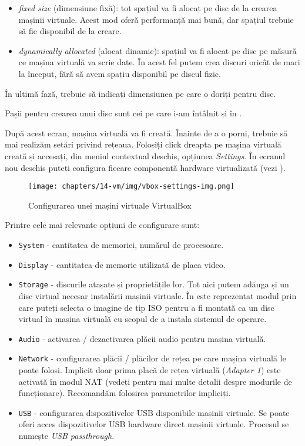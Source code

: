 \begin{itemize}
  \item \textit{fixed size} (dimensiune fixă): tot spațiul va fi alocat pe disc de la crearea mașinii virtuale.
    Acest mod oferă performanță mai bună, dar spațiul trebuie să fie disponibil de la creare.
  \item \textit{dynamically allocated} (alocat dinamic): spațiul va fi alocat pe disc pe măsură ce mașina virtuală va scrie date.
    În acest fel putem crea discuri oricât de mari la început, fără să avem spațiu disponibil pe discul fizic.
\end{itemize}

În ultimă fază, trebuie să indicați dimensiunea pe care o doriți pentru disc.

Pașii pentru crearea unui disc sunt cei pe care i-am întâlnit și în .

După acest ecran, mașina virtuală va fi creată.
Înainte de a o porni, trebuie să mai realizăm setări privind rețeaua.
Folosiți click dreapta pe mașina virtuală creată și accesați, din meniul contextual deschis, opțiunea \textit{Settings}.
În ecranul nou deschis puteți configura fiecare componentă hardware virtualizată (vezi ).

\begin{figure}[!htbp]
  \centering
  \texttt{[image: chapters/14-vm/img/vbox-settings-img.png]}
  \caption{Configurarea unei mașini virtuale VirtualBox}
  \label{fig:vm:vbox-settings}
\end{figure}

Printre cele mai relevante opțiuni de configurare sunt:

\begin{itemize}
  \item \texttt{System} - cantitatea de memoriei, numărul de procesoare.
  \item \texttt{Display} - cantitatea de memorie utilizată de placa video.
  \item \texttt{Storage} - discurile atașate și proprietățile lor.
    Tot aici putem adăuga și un disc virtual necesar instalării mașinii virtuale.
    În  este reprezentat modul prin care puteți selecta o imagine de tip ISO pentru a fi montată ca un disc virtual în mașina virtuală cu scopul de a instala sistemul de operare.
  \item \texttt{Audio} - activarea / dezactivarea plăcii audio pentru mașina virtuală.
  \item \texttt{Network} - configurarea plăcii / plăcilor de rețea pe care mașina virtuală le poate folosi.
    Implicit doar prima placă de rețea virtuală (\textit{Adapter 1}) este activată în modul NAT (vedeți  pentru mai multe detalii despre modurile de funcționare).
    Recomandăm folosirea parametrilor impliciți.
  \item \texttt{USB} - configurarea dispozitivelor USB disponibile mașinii virtuale.
    Se poate oferi acces dispozitivelor USB hardware direct mașinii virtuale.
    Procesul se numește \textit{USB passthrough}.
\end{itemize}

